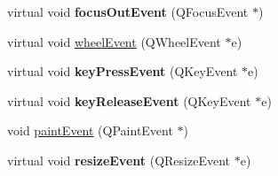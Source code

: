\begin{DoxyCompactItemize}
\item 
\hypertarget{classQG__GraphicView_a4033cb8e842820611ebc91d47d9b9997}{virtual void {\bfseries focus\-Out\-Event} (Q\-Focus\-Event $\ast$)}\label{classQG__GraphicView_a4033cb8e842820611ebc91d47d9b9997}

\item 
virtual void \hyperlink{classQG__GraphicView_ae9c82f49af340252d3193b1f0a0ce54a}{wheel\-Event} (Q\-Wheel\-Event $\ast$e)
\item 
\hypertarget{classQG__GraphicView_abdb29b1f333f1e7ff60252cb730afade}{virtual void {\bfseries key\-Press\-Event} (Q\-Key\-Event $\ast$e)}\label{classQG__GraphicView_abdb29b1f333f1e7ff60252cb730afade}

\item 
\hypertarget{classQG__GraphicView_a6f1336089ec16fc079fcc2744c6e9e15}{virtual void {\bfseries key\-Release\-Event} (Q\-Key\-Event $\ast$e)}\label{classQG__GraphicView_a6f1336089ec16fc079fcc2744c6e9e15}

\item 
void \hyperlink{classQG__GraphicView_abdb286b97e5cc968ede3ecee041bf213}{paint\-Event} (Q\-Paint\-Event $\ast$)
\item 
\hypertarget{classQG__GraphicView_a4785323c6b7aae5efeeca1165ab8067c}{virtual void {\bfseries resize\-Event} (Q\-Resize\-Event $\ast$e)}\label{classQG__GraphicView_a4785323c6b7aae5efeeca1165ab8067c}

\end{DoxyCompactItemize}
